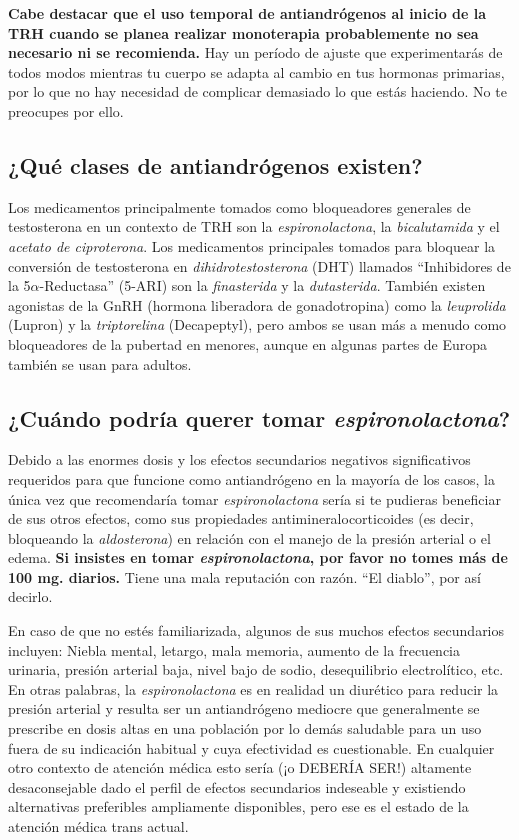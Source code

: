 \documentclass{article}
\begin{document}
\textbf{Cabe destacar que el uso temporal de antiandrógenos al inicio de la TRH cuando se planea realizar monoterapia probablemente no sea necesario ni se recomienda.} Hay un período de ajuste que experimentarás de todos modos mientras tu cuerpo se adapta al cambio en tus hormonas primarias, por lo que no hay necesidad de complicar demasiado lo que estás haciendo. No te preocupes por ello.

\subsection{¿Qué clases de antiandrógenos existen?}

Los medicamentos principalmente tomados como bloqueadores generales de testosterona en un contexto de TRH son la \textit{espironolactona}, la \textit{bicalutamida} y el \textit{acetato de ciproterona}. Los medicamentos principales tomados para bloquear la conversión de testosterona en \textit{dihidrotestosterona} (DHT) llamados “Inhibidores de la 5$\alpha$-Reductasa” (5-ARI) son la \textit{finasterida} y la \textit{dutasterida}. También existen agonistas de la GnRH (hormona liberadora de gonadotropina) como la \textit{leuprolida} (Lupron) y la \textit{triptorelina} (Decapeptyl), pero ambos se usan más a menudo como bloqueadores de la pubertad en menores, aunque en algunas partes de Europa también se usan para adultos.

\subsection{¿Cuándo podría querer tomar \textit{espironolactona}?}

Debido a las enormes dosis y los efectos secundarios negativos significativos requeridos para que funcione como antiandrógeno en la mayoría de los casos, la única vez que recomendaría tomar \textit{espironolactona} sería si te pudieras beneficiar de sus otros efectos, como sus propiedades antimineralocorticoides (es decir, bloqueando la \textit{aldosterona}) en relación con el manejo de la presión arterial o el edema. \textbf{Si insistes en tomar \textit{espironolactona}, por favor no tomes más de 100 mg. diarios.} Tiene una mala reputación con razón. “El diablo”, por así decirlo.

En caso de que no estés familiarizada, algunos de sus muchos efectos secundarios incluyen: Niebla mental, letargo, mala memoria, aumento de la frecuencia urinaria, presión arterial baja, nivel bajo de sodio, desequilibrio electrolítico, etc. En otras palabras, la \textit{espironolactona} es en realidad un diurético para reducir la presión arterial y resulta ser un antiandrógeno mediocre que generalmente se prescribe en dosis altas en una población por lo demás saludable para un uso fuera de su indicación habitual y cuya efectividad es cuestionable. En cualquier otro contexto de atención médica esto sería (¡o DEBERÍA SER!) altamente desaconsejable dado el perfil de efectos secundarios indeseable y existiendo alternativas preferibles ampliamente disponibles, pero ese es el estado de la atención médica trans actual.
\end{document}
